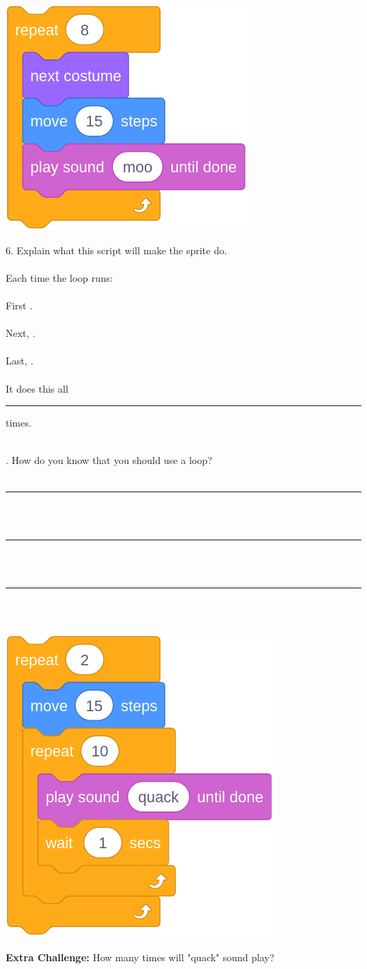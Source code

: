 \documentclass[letterpaper,12pt]{article}
\newcommand\numbox{%
    \fbox{\rule{1in}{0pt}\rule[-1ex]{0pt}{5ex}}}
\begin{document}
\begin{center}
\includegraphics[scale=.3]{q6_script0.png}
\end{center}
6. Explain what this script will make the sprite do. \\ \\
Each time the loop runs: \\ \\
\indent First \hrulefill. \\ \\
\indent Next, \hrulefill. \\ \\
\indent Last, \hrulefill. \\ \\
It does this all \rule{1cm}{0.5pt} times.

\noindent \dotfill \\

. How do you know that you should use a loop? \\ \\
\noindent \rule{18.5cm}{0.5pt} \\ \\
\noindent \rule{18.5cm}{0.5pt} \\ \\
\noindent \rule{18.5cm}{0.5pt} \\

\noindent \dotfill \\
\begin{center}
\includegraphics[scale=.3]{ec_script0.png}
\end{center}

\noindent \textbf{Extra Challenge:} How many times will "quack" sound play? \numbox
\end{document}

